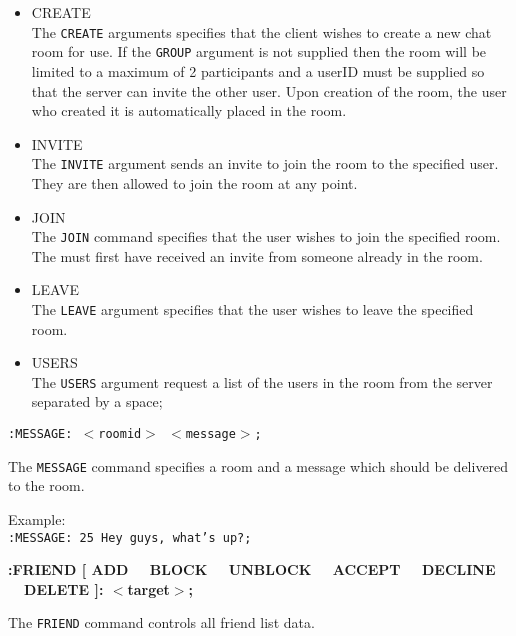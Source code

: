 \begin{itemize}

\item{CREATE \\
The \texttt{CREATE} arguments specifies that the client wishes to create a new chat room for use. If the \texttt{GROUP} argument is not supplied then the room will be limited to a maximum of 2 participants and a userID must be supplied so that the server can invite the other user. Upon creation of the room, the user who created it is automatically placed in the room.}

\item {INVITE \\
The \texttt{INVITE} argument sends an invite to join the room to the specified user. They are then allowed to join the room at any point.}

\item{JOIN \\
The \texttt{JOIN} command specifies that the user wishes to join the specified room. The must first have received an invite from someone already in the room.}

\item{LEAVE \\
The \texttt{LEAVE} argument specifies that the user wishes to leave the specified room.}

\item{USERS \\
The \texttt{USERS} argument request a list of the users in the room from the server separated by a space;}

\end{itemize}

\texttt{:MESSAGE: $<$roomid$>$ $<$message$>$;}

The \texttt{MESSAGE} command specifies a room and a message which should be delivered to the room.

Example: \\
\texttt{:MESSAGE: 25 Hey guys, what’s up?;}

{\bf :FRIEND [ ADD \ \vline \ BLOCK \ \vline \ UNBLOCK \ \vline \ ACCEPT \ \vline \ DECLINE \ \vline \ DELETE ]: $<$target$>$;}

The \texttt{FRIEND} command controls all friend list data.

